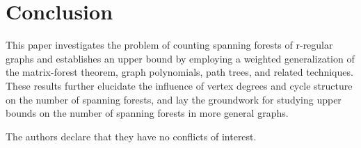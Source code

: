 \documentclass[11pt, a4paper]{article}
\begin{document}
\section{Conclusion}

This paper investigates the problem of counting spanning forests of 
r-regular graphs and establishes an upper bound by employing a weighted generalization of the matrix-forest theorem, graph polynomials, path trees, and related techniques. These results further elucidate the influence of vertex degrees and cycle structure on the number of spanning forests, and lay the groundwork for studying upper bounds on the number of spanning forests in more general graphs.


The authors declare that they have no conflicts of interest.
\renewcommand\refname{\ References}
\end{document}
